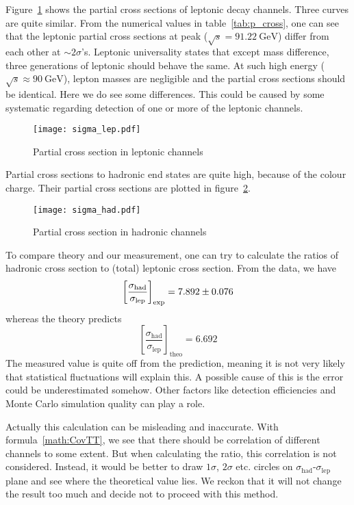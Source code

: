 Figure~\ref{fig:lepCross} shows the partial cross sections of leptonic decay channels. Three curves are quite similar. From the numerical values in table~\ref{tab:p_cross}, one can see that the leptonic partial cross sections at peak ($\sqrt{s} = \SI{91.22}{\giga\eV}$) differ from each other at $\sim 2 \sigma$'s. Leptonic universality states that except mass difference, three generations of leptonic should behave the same. At such high energy ($\sqrt{s} \approx \SI{90}{\giga\eV}$), lepton masses are negligible and the partial cross sections should be identical. Here we do see some differences. This could be caused by some systematic regarding detection of one or more of the leptonic channels.
\begin{figure}[ht]
	\centering
	\texttt{[image: sigma\_lep.pdf]}
	\caption{Partial cross section in leptonic channels}%
	\label{fig:lepCross}
\end{figure}

Partial cross sections to hadronic end states are quite high, because of the colour charge. Their partial cross sections are plotted in figure~\ref{fig:hadCross}.
\begin{figure}[ht]
	\centering
	\texttt{[image: sigma\_had.pdf]}
	\caption{Partial cross section in hadronic channels}%
	\label{fig:hadCross}
\end{figure}

To compare theory and our measurement, one can try to calculate the ratios of hadronic cross section to (total) leptonic cross section. From the data, we have
\begin{equation}
	\left[ \frac{\sigma_\text{had}}{\sigma_\text{lep}} \right]_\text{exp}= \num{7.892 +- 0.076}
\end{equation}
whereas the theory predicts
\begin{equation}
	\left[ \frac{\sigma_\text{had}}{\sigma_\text{lep}} \right]_\text{theo}= \num{6.692}
\end{equation}
The measured value is quite off from the prediction, meaning it is not very likely that statistical fluctuations will explain this. A possible cause of this is the error could be underestimated somehow. Other factors like detection efficiencies and Monte Carlo simulation quality can play a role.

Actually this calculation can be misleading and inaccurate. With formula~\ref{math:CovTT}, we see that there should be correlation of different channels to some extent. But when calculating the ratio, this correlation is not considered. Instead, it would be better to draw $1\sigma$, $2\sigma$ etc. circles on $\sigma_\text{had}$-$\sigma_\text{lep}$ plane and see where the theoretical value lies. We reckon that it will not change the result too much and decide not to proceed with this method.

